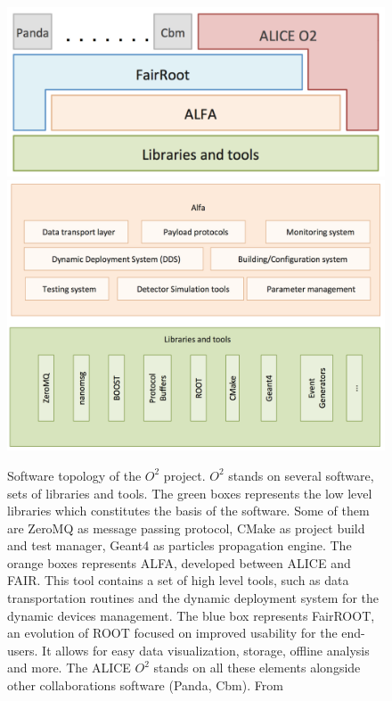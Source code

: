 \begin{figure}[!ht]
\begin{center}
\includegraphics[width=0.8\linewidth]{Chapters/O2/Figs/O2_soft_tree.pdf}
\includegraphics[width=0.7\linewidth]{Chapters/O2/Figs/ALFA.pdf}
\caption{Software topology of the $O^2$ project. $O^2$ stands on several software, sets of libraries and tools. The green boxes represents the low level libraries which constitutes the basis of the software. Some of them are ZeroMQ as message passing protocol, CMake as project build and test manager, Geant4 as particles propagation engine. The orange boxes represents ALFA, developed between ALICE and FAIR. This tool contains a set of high level tools, such as data transportation routines and the dynamic deployment system for the dynamic devices management. The blue box represents FairROOT, an evolution of ROOT focused on improved usability for the end-users. It allows for easy data visualization, storage, offline analysis and more. The ALICE $O^2$ stands on all these elements alongside other collaborations software (Panda, Cbm).  From \cite{Buncic:2011297}}
\label{fig:O2_soft_tree}
\end{center}
\end{figure}


